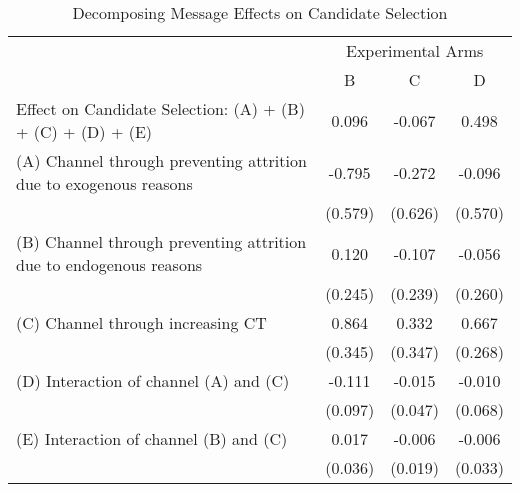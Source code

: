 \documentclass[12pt, a4paper]{article}
\begin{document}
\begin{table}[H]

\caption{\label{tab:decompose-candidate}Decomposing Message Effects on Candidate Selection}
\centering
\fontsize{8}{10}\selectfont
\begin{threeparttable}
\begin{tabular}[t]{lccc}
\toprule
\multicolumn{1}{c}{ } & \multicolumn{3}{c}{Experimental Arms} \\
\cmidrule(l{3pt}r{3pt}){2-4}
 & B & C & D\\
\midrule
Effect on Candidate Selection: (A) + (B) + (C) + (D) + (E) & 0.096 & -0.067 & 0.498\\
(A) Channel through preventing attrition due to exogenous reasons & -0.795 & -0.272 & -0.096\\
 & (0.579) & (0.626) & (0.570)\\
(B) Channel through preventing attrition due to endogenous reasons & 0.120 & -0.107 & -0.056\\
 & (0.245) & (0.239) & (0.260)\\
(C) Channel through increasing CT & 0.864 & 0.332 & 0.667\\
 & (0.345) & (0.347) & (0.268)\\
(D) Interaction of channel (A) and (C) & -0.111 & -0.015 & -0.010\\
 & (0.097) & (0.047) & (0.068)\\
(E) Interaction of channel (B) and (C) & 0.017 & -0.006 & -0.006\\
 & (0.036) & (0.019) & (0.033)\\
\bottomrule
\end{tabular}
\begin{tablenotes}
\item 
\end{tablenotes}
\end{threeparttable}
\end{table}

\clearpage


\end{document}

